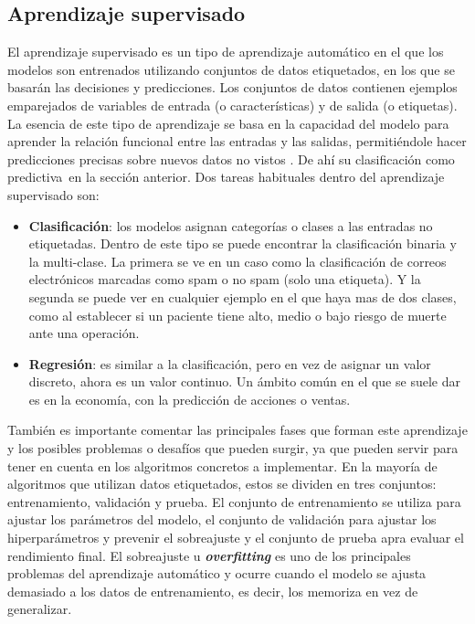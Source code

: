 \subsection{Aprendizaje supervisado}
El aprendizaje supervisado es un tipo de aprendizaje automático en el que los modelos son entrenados utilizando conjuntos de datos etiquetados, en los que se basarán las decisiones y predicciones. Los conjuntos de datos contienen ejemplos emparejados de variables de entrada (o características) y de salida (o etiquetas). La esencia de este tipo de aprendizaje se basa en la capacidad del modelo para aprender la relación funcional entre las entradas y las salidas, permitiéndole hacer predicciones precisas sobre nuevos datos no vistos \cite{SL:guide}. De ahí su clasificación como \guillemetleft predictiva\guillemetright ~en la sección anterior.
Dos tareas habituales dentro del aprendizaje supervisado son:
\begin{itemize}
	\item \textbf{Clasificación}: los modelos asignan categorías o clases a las entradas no etiquetadas. Dentro de este tipo se puede encontrar la clasificación binaria y la multi-clase. La primera se ve en un caso como la clasificación de correos electrónicos marcadas como spam o no spam (solo una etiqueta). Y la segunda se puede ver en cualquier ejemplo en el que haya mas de dos clases, como al establecer si un paciente tiene alto, medio o bajo riesgo de muerte ante una operación.
	\item \textbf{Regresión}: es similar a la clasificación, pero en vez de asignar un valor discreto, ahora es un valor continuo. Un ámbito común en el que se suele dar es en la economía, con la predicción de acciones o ventas.
\end{itemize}

También es importante comentar las principales fases que forman este aprendizaje y los posibles problemas o desafíos que pueden surgir, ya que pueden servir para tener en cuenta en los algoritmos concretos a implementar.
En la mayoría de algoritmos que utilizan datos etiquetados, estos se dividen en tres conjuntos: entrenamiento, validación y prueba. El conjunto de entrenamiento se utiliza para ajustar los parámetros del modelo, el conjunto de validación para ajustar los hiperparámetros y prevenir el sobreajuste y el conjunto de prueba apra evaluar el rendimiento final.
El sobreajuste u \textit{\textbf{overfitting}} es uno de los principales problemas del aprendizaje automático y ocurre cuando el modelo se ajusta demasiado a los datos de entrenamiento, es decir, los memoriza en vez de generalizar.

